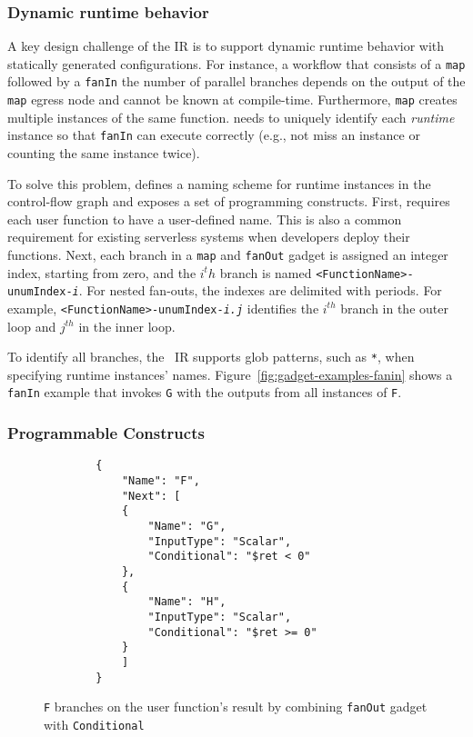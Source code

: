 

\subsubsection{Dynamic runtime behavior}\label{sec:ir:naming}


A key design challenge of the \name{} IR is to support dynamic runtime
behavior with statically generated configurations.
For instance, a workflow that consists of a \texttt{map}  followed by a
\texttt{fanIn} the number of parallel branches depends on the output of
the \texttt{map} egress node and cannot be known at compile-time. Furthermore,
\texttt{map} creates multiple instances of the same function. \name{} needs to
uniquely identify each \emph{runtime} instance so that \texttt{fanIn} can
execute correctly (e.g., not miss an instance or counting the same instance
twice).

To solve this problem, \name{} defines a naming scheme for runtime instances
in the control-flow graph and exposes a set of programming constructs. First,
\name{} requires each user function to have a user-defined name. This is also
a common requirement for existing serverless systems when developers deploy
their functions. Next, each branch in a \texttt{map} and \texttt{fanOut}
gadget is assigned an integer index, starting from zero, and the $i^th$ branch
is named \texttt{<FunctionName>-unumIndex-\emph{i}}. For nested fan-outs, the
indexes are delimited with periods. For example,
\texttt{<FunctionName>-unumIndex-\emph{i.j}} identifies the $i^{th}$ branch in
the outer loop and $j^{th}$ in the inner loop.

To identify all branches, the \name{}~IR supports glob patterns, such as
\texttt{*}, when specifying runtime instances' names.
Figure~\ref{fig:gadget-examples-fanin} shows a \texttt{fanIn} example that
invokes \texttt{G} with the outputs from all instances of \texttt{F}.

\subsubsection{Programmable Constructs }

\begin{figure}[]
	\begin{verbatim}
		{
			"Name": "F",
			"Next": [
			{
				"Name": "G",
				"InputType": "Scalar",
				"Conditional": "$ret < 0"
			},
			{
				"Name": "H",
				"InputType": "Scalar",
				"Conditional": "$ret >= 0"
			}
			]
		}
	\end{verbatim}
	\caption{\texttt{F} branches on the user function's result by
		combining \texttt{fanOut} gadget with \texttt{Conditional}}
	\label{fig:gadget-examples-branch}
\end{figure}

